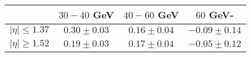 \centering
\begin{tabular}{cccc}  \toprule\toprule
 & $30-40$ GeV & $40-60$ GeV & $60$ GeV-\\\midrule
$\lvert \eta \rvert \leq 1.37$ & $0.30\pm0.03$ & $0.16\pm0.04$ & $-0.09\pm0.14$\\
$\lvert \eta \rvert \geq 1.52$ & $0.19\pm0.03$ & $0.17\pm0.04$ & $-0.05\pm0.12$\\
\bottomrule\bottomrule
\end{tabular}